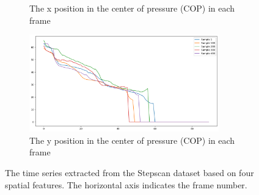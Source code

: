 \begin{figure}
\begin{subfigure}[b]{0.5\textwidth}
         \caption{The x position in the center of pressure (COP) in each frame}
         \label{fig:extracted_features_xCe}
     \end{subfigure}
     \hfill
     \begin{subfigure}[b]{0.5\textwidth}
         \centering
         \includegraphics[width=0.9\textwidth]{manuscript/src/figures/project/df_yCe.png}
         \caption{The y position in the center of pressure (COP) in each frame}
         \label{fig:extracted_features_yCe}
     \end{subfigure} 
        \caption{The time series extracted from the Stepscan dataset based on four spatial features. The horizontal axis indicates the frame number.}
        \label{fig:extracted_features}
\end{figure}




